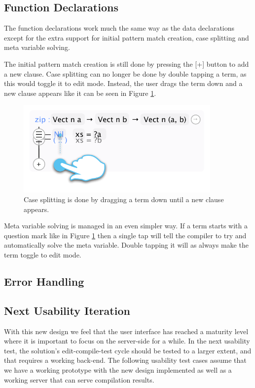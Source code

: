 \subsection{Function Declarations}
\label{subsec:new_design_function_dec}
The function declarations work much the same way as the data declarations
except for the extra support for initial pattern match creation, case splitting
and meta variable solving.

The initial pattern match creation is still done by pressing the [+] button to
add a new clause. Case splitting can no longer be done by double tapping a
term, as this would toggle it to edit mode. Instead, the user drags the term
down and a new clause appears like it can be seen in Figure
\ref{fig:case_splitting}.

\begin{figure}
	\centering
		\includegraphics[width=100mm]{diagrams/design_case_splitting.pdf}
	\caption{Case splitting is done by dragging a term down until a new clause
	appears.}
\label{fig:case_splitting}
\end{figure}

Meta variable solving is managed in an even simpler way. If a term starts with
a question mark like in Figure \ref{fig:case_splitting} then a single tap will
tell the compiler to try and automatically solve the meta variable. Double
tapping it will as always make the term toggle to edit mode.



\subsection{Error Handling}







\subsection{Next Usability Iteration}
With this new design we feel that the user interface has reached a maturity
level where it is important to focus on the server-side for a while. In the
next usability test, the solution's edit-compile-test cycle should be tested to
a larger extent, and that requires a working back-end. The following usability
test cases assume that we have a working prototype with the new design
implemented as well as a working server that can serve compilation results.

